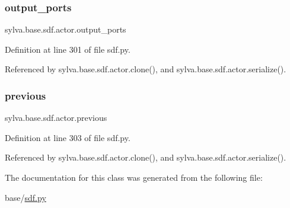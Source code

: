 \subsubsection{\texorpdfstring{output\+\_\+ports}{output\_ports}}
{\footnotesize\ttfamily sylva.\+base.\+sdf.\+actor.\+output\+\_\+ports}



Definition at line 301 of file sdf.\+py.



Referenced by sylva.\+base.\+sdf.\+actor.\+clone(), and sylva.\+base.\+sdf.\+actor.\+serialize().

\mbox{\label{classsylva_1_1base_1_1sdf_1_1actor_ac3043c8e8aa528bb6d00465b0a1964d3}} 
\subsubsection{\texorpdfstring{previous}{previous}}
{\footnotesize\ttfamily sylva.\+base.\+sdf.\+actor.\+previous}



Definition at line 303 of file sdf.\+py.



Referenced by sylva.\+base.\+sdf.\+actor.\+clone(), and sylva.\+base.\+sdf.\+actor.\+serialize().



The documentation for this class was generated from the following file\+:\begin{DoxyCompactItemize}
\item 
base/\hyperlink{sdf_8py}{sdf.\+py}\end{DoxyCompactItemize}
